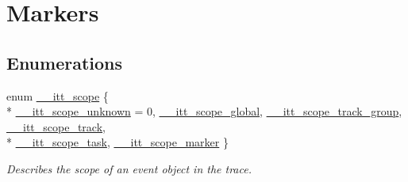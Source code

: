 \hypertarget{group__markers}{\section{Markers}
\label{group__markers}
}
\subsection*{Enumerations}
\begin{DoxyCompactItemize}
\item 
enum \hyperlink{group__markers_ga9712c6a992a435d4d134e7164f609f04}{\-\_\-\-\_\-itt\-\_\-scope} \{ \\*
\hyperlink{group__markers_gga9712c6a992a435d4d134e7164f609f04ad6b2bb3dfb8a48ee3f7613e50015cf9a}{\-\_\-\-\_\-itt\-\_\-scope\-\_\-unknown} = 0, 
\hyperlink{group__markers_gga9712c6a992a435d4d134e7164f609f04ad72ff04a175559f3187be4ff752b16d6}{\-\_\-\-\_\-itt\-\_\-scope\-\_\-global}, 
\hyperlink{group__markers_gga9712c6a992a435d4d134e7164f609f04a0ba3625570d2e969a85e0a2b486bb5c8}{\-\_\-\-\_\-itt\-\_\-scope\-\_\-track\-\_\-group}, 
\hyperlink{group__markers_gga9712c6a992a435d4d134e7164f609f04a4e61a9c628aa9e1088d54efc75e2c263}{\-\_\-\-\_\-itt\-\_\-scope\-\_\-track}, 
\\*
\hyperlink{group__markers_gga9712c6a992a435d4d134e7164f609f04af81bcf55eaba2fb507be64a5b3169013}{\-\_\-\-\_\-itt\-\_\-scope\-\_\-task}, 
\hyperlink{group__markers_gga9712c6a992a435d4d134e7164f609f04a4ff6b842c3c5daa0be7ae13fb3497852}{\-\_\-\-\_\-itt\-\_\-scope\-\_\-marker}
 \}
\begin{DoxyCompactList}\small\item\em Describes the scope of an event object in the trace. \end{DoxyCompactList}\end{DoxyCompactItemize}
